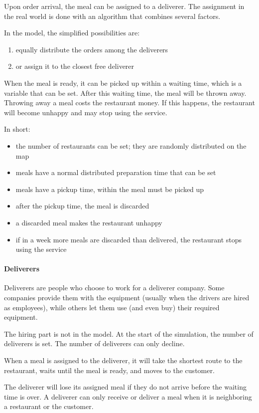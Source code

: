 Upon order arrival, the meal can be assigned to a deliverer.
The assignment in the real world is done with an algorithm that combines several factors.

In the model, the simplified possibilities are:
\begin{enumerate}
\item equally distribute the orders among the deliverers
\item or assign it to the closest free deliverer
\end{enumerate}

When the meal is ready, it can be picked up within a waiting time, which is a variable that can be set.
After this waiting time, the meal will be thrown away.
Throwing away a meal costs the restaurant money. If this happens, the restaurant will become unhappy and may stop using the service.

In short:
\begin{itemize}
\item the number of restaurants can be set; they are randomly distributed on the map
\item meals have a normal distributed preparation time that can be set
\item meals have a pickup time, within the meal must be picked up
\item after the pickup time, the meal is discarded
\item a discarded meal makes the restaurant unhappy
\item if in a week more meals are discarded than delivered, the restaurant stops using the service
\end{itemize}

\paragraph{Deliverers}
Deliverers are people who choose to work for a deliverer company.
Some companies provide them with the equipment (usually when the drivers are hired as employees), while others
let them use (and even buy) their required equipment.

The hiring part is not in the model.
At the start of the simulation, the number of deliverers is set.
The number of deliverers can only decline.

When a meal is assigned to the deliverer, it will take the shortest route
to the restaurant, waits until the meal is ready, and moves to the customer.

The deliverer will lose its assigned meal if they do not arrive before the waiting time is over.
A deliverer can only receive or deliver a meal when it is neighboring a restaurant or the customer.

